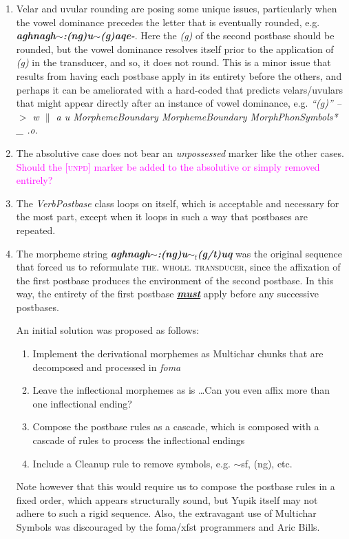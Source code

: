 \documentclass{article}
\begin{document}
\begin{enumerate}
\item Velar and uvular rounding are posing some unique issues, particularly when the vowel dominance precedes the letter that is eventually rounded, e.g. \textit{\textbf{aghnagh$\sim$:(ng)u$\sim$(g)aqe-}}. Here the \textit{(g)} of the second postbase should be rounded, but the vowel dominance resolves itself prior to the application of \textit{(g)} in the transducer, and so, it does not round.  This is a minor issue that results from having each postbase apply in its entirety before the others, and perhaps it can be ameliorated with a hard-coded that predicts velars/uvulars that might appear directly after an instance of vowel dominance, e.g. \textit{``(g)'' --$>$ w $\|$ a u MorphemeBoundary MorphemeBoundary MorphPhonSymbols* \_ .o.}

\item The absolutive case does not bear an \textit{unpossessed} marker like the other cases. \textcolor{magenta}{Should the [\textsc{unpd}] marker be added to the absolutive or simply removed entirely?}

\item The \textit{VerbPostbase} class loops on itself, which is acceptable and necessary for the most part, except when it loops in such a way that postbases are repeated.

\item The morpheme string \textit{\textbf{aghnagh$\sim$:(ng)u${\sim}_\text{f}$(g/t)uq}} was the original sequence that forced us to reformulate \textsc{the. whole. transducer}, since the affixation of the first postbase produces the environment of the second postbase. In this way, the entirety of the first postbase \textit{\textbf{\uline{must}}} apply before any successive postbases.

An initial solution was proposed as follows:
\begin{enumerate}[label=\roman*.]
\item Implement the derivational morphemes as Multichar chunks that are decomposed and processed in \textit{foma}
\item Leave the inflectional morphemes as is \ldots Can you even affix more than one inflectional ending?
\item Compose the postbase rules as a cascade, which is composed with a cascade of rules to process the inflectional endings
\item Include a Cleanup rule to remove symbols, e.g. $\sim$sf, (ng), etc.
\end{enumerate}
Note however that this would require us to compose the postbase rules in a fixed order, which appears structurally sound, but Yupik itself may not adhere to such a rigid sequence. Also, the extravagant use of Multichar Symbols was discouraged by the foma/xfst programmers and Aric Bills.


\end{enumerate}
\end{document}
